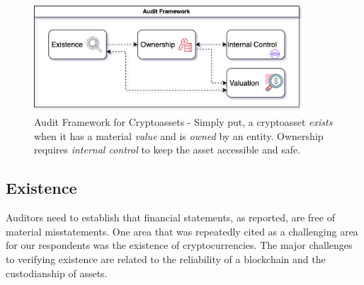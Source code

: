 \begin{figure}[h]\label{fig:dataflow}
    \centering
    \includegraphics[width=0.9\textwidth]{figures/audit_framework.png}
    \caption[Audit Framework for Cryptoassets]{Audit Framework for Cryptoassets - Simply put, a cryptoasset \textit{exists} when it has a material \textit{value} and is \textit{owned} by an entity. Ownership requires \textit{internal control} to keep the asset accessible and safe.}
\end{figure}	

\subsection{Existence} \label{sec:auditing:framework:existence}
Auditors need to establish that financial statements, as reported, are free of material misstatements. One area that was repeatedly cited as a challenging area for our respondents was the existence of cryptocurrencies. The major challenges to verifying existence are related to the reliability of a blockchain and the custodianship of assets.

